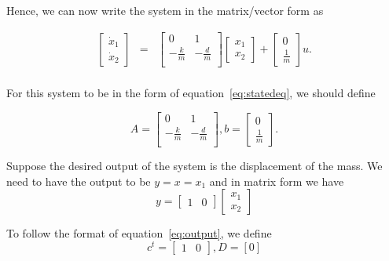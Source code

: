 \noindent Hence, we can now write the system in the matrix/vector
form as

\begin{eqnarray*}
         \left[\begin{array}{c}\dot x_{1}\\ \dot x_{2}\end{array}\right]&=&\left[\begin{array}{cc} 0&1\\-\frac{k}{m}&-\frac{d}{m}\\\end{array}
        \right]\left[\begin{array}{c} x_{1}\\ x_{2}\end{array}\right]+\left[\begin{array}{c} 0\\\frac{1}{m} \end{array}\right] u.\\
\end{eqnarray*}

\noindent For this system to be in the form of
equation~\ref{eq:statedeq}, we should define

\begin{displaymath}A=\left[\begin{array}{cc}
                    0&1\\
                    -\frac{k}{m}&-\frac{d}{m}\\
                    \end{array}\right], b=\left[
                    \begin{array}{c}
                    0\\\frac{1}{m}
                    \end{array}\right].
\end{displaymath}

\medskip Suppose the desired output of the system is the
displacement of the mass.  We need to have the output to be
$y=x=x_{1}$ and in matrix form we have
\begin{displaymath}
y=\left[\begin{array}{cc}1&0\end{array}\right]\left[\begin{array}{c}x_{1}\\x_{2}\end{array}\right]
\end{displaymath}

\noindent To follow the format of equation~\ref{eq:output}, we
define
\begin{displaymath}
c^{t}=\left[\begin{array}{cc}1&0\end{array}\right], D=[0]
\end{displaymath}

